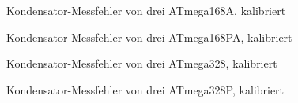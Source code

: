\begin{figure}[H]
\centering

\caption{Kondensator-Messfehler von drei ATmega168A, kalibriert}
\label{fig:mega168Acal}
\end{figure}

\begin{figure}[H]
\centering

\caption{Kondensator-Messfehler von drei ATmega168PA, kalibriert}
\label{fig:mega168PAcal}
\end{figure}

\begin{figure}[H]
\centering

\caption{Kondensator-Messfehler von drei ATmega328, kalibriert}
\label{fig:mega328cal}
\end{figure}

\begin{figure}[H]
\centering

\caption{Kondensator-Messfehler von drei ATmega328P, kalibriert}
\label{fig:mega328Pcal}
\end{figure}

